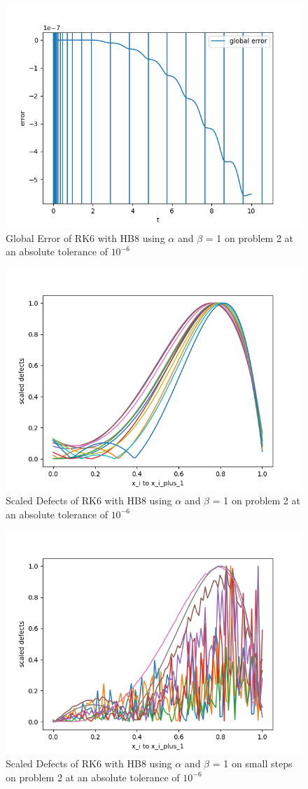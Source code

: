 \documentclass{article}
\begin{document}
\begin{figure}[H]
\centering
\includegraphics[width=0.7\linewidth]{./figures/static_alpha_rk6_with_hb8_p2_global_error}
\caption{Global Error of RK6 with HB8 using $\alpha$ and $\beta$ = 1 on problem 2 at an absolute tolerance of $10^{-6}$}
\label{fig:static_alpha_rk6_with_hb8_p2_global_error}
\end{figure}

\begin{figure}[H]
\centering
\includegraphics[width=0.7\linewidth]{./figures/static_alpha_rk6_with_hb8_p2_scaled_defects}
\caption{Scaled Defects of RK6 with HB8 using $\alpha$ and $\beta$ = 1 on problem 2 at an absolute tolerance of $10^{-6}$}
\label{fig:static_alpha_rk6_with_hb8_p2_scaled_defects}
\end{figure}

\begin{figure}[H]
\centering
\includegraphics[width=0.7\linewidth]{./figures/static_alpha_rk6_with_hb8_p2_scaled_defects_small_steps}
\caption{Scaled Defects of RK6 with HB8 using $\alpha$ and $\beta$ = 1 on small steps on problem 2 at an absolute tolerance of $10^{-6}$}
\label{fig:static_alpha_rk6_with_hb8_p2_scaled_defects_small_steps}
\end{figure}
\end{document}

